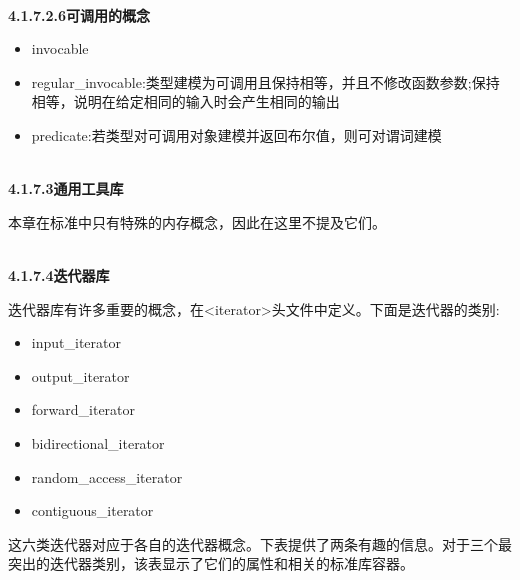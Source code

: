 \hspace*{\fill} \\ %
\noindent
\textbf{4.1.7.2.6\hspace{0.2cm}可调用的概念}

\begin{itemize}
\item
invocable

\item
regular\_invocable:类型建模为可调用且保持相等，并且不修改函数参数;保持相等，说明在给定相同的输入时会产生相同的输出

\item
predicate:若类型对可调用对象建模并返回布尔值，则可对谓词建模
\end{itemize}

\hspace*{\fill} \\ %
\noindent
\textbf{4.1.7.3\hspace{0.2cm}通用工具库}

本章在标准中只有特殊的内存概念，因此在这里不提及它们。

\hspace*{\fill} \\ %
\noindent
\textbf{4.1.7.4\hspace{0.2cm}迭代器库}

迭代器库有许多重要的概念，在<iterator>头文件中定义。下面是迭代器的类别:

\begin{itemize}
\item
input\_iterator

\item
output\_iterator

\item
forward\_iterator

\item
bidirectional\_iterator

\item
random\_access\_iterator

\item
contiguous\_iterator
\end{itemize}

这六类迭代器对应于各自的迭代器概念。下表提供了两条有趣的信息。对于三个最突出的迭代器类别，该表显示了它们的属性和相关的标准库容器。

